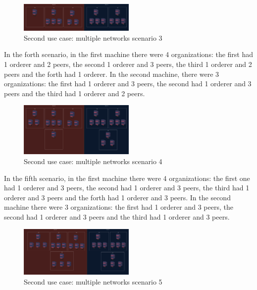 \begin{figure}[H]
    \centering
    \includegraphics[width=0.5\textwidth]{assets/use-case-2/scenario3.png} %
    \caption{Second use case: multiple networks scenario 3}
    \label{fig:sample-image} 
\end{figure}

In the forth scenario, in the first machine there were 4 organizations: the first had 1 orderer and 2 peers, the second 1 orderer and 3 peers, the third 1 orderer and 2 peers and the forth had 1 orderer. In the second machine, there were 3 organizations: the first had 1 orderer and 3 peers, the second had 1 orderer and 3 peers and the third had 1 orderer and 2 peers.

\begin{figure}[H]
    \centering
    \includegraphics[width=0.5\textwidth]{assets/use-case-2/scenario4.png} %
    \caption{Second use case: multiple networks scenario 4}
    \label{fig:sample-image} 
\end{figure}

In the fifth scenario, in the first machine there were 4 organizations: the first one had 1 orderer and 3 peers, the second had 1 orderer and 3 peers, the third had 1 orderer and 3 peers and the forth had 1 orderer and 3 peers. In the second machine there were 3 organizations: the first had 1 orderer and 3 peers, the second had 1 orderer and 3 peers and the third had 1 orderer and 3 peers.

\begin{figure}[H]
    \centering
    \includegraphics[width=0.5\textwidth]{assets/use-case-2/scenario5.png} %
    \caption{Second use case: multiple networks scenario 5}
    \label{fig:sample-image} 
\end{figure}

